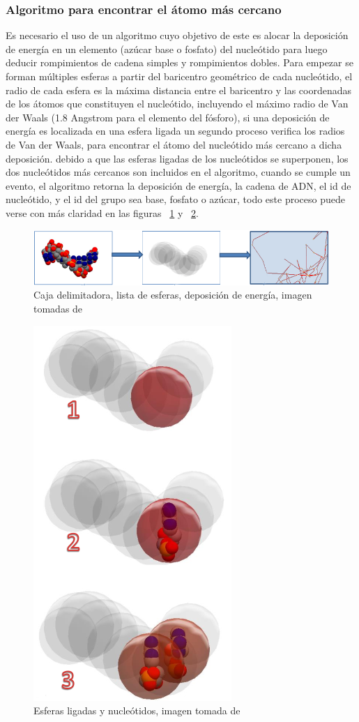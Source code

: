 \subsubsection{Algoritmo para encontrar el átomo más cercano}
Es necesario el uso de un algoritmo cuyo objetivo de este es alocar la deposición de energía en un elemento (azúcar base o fosfato) del nucleótido para luego deducir rompimientos de cadena simples y rompimientos dobles.
Para empezar se forman múltiples esferas a partir del baricentro geométrico de cada nucleótido, el radio de cada esfera es la máxima distancia entre el baricentro y las coordenadas de los átomos que constituyen el nucleótido, incluyendo el máximo radio de Van der Waals (1.8 Angstrom para el elemento del fósforo), si una deposición de energía es localizada en una esfera ligada un segundo proceso verifica los radios de Van der Waals, para encontrar el átomo del nucleótido más cercano a dicha deposición. debido a que las esferas ligadas de los nucleótidos se superponen, los dos nucleótidos más cercanos son incluidos en el algoritmo, cuando se cumple un evento, el algoritmo retorna la deposición de energía, la cadena de ADN, el id de nucleótido, y el id del grupo sea base, fosfato o azúcar, todo este proceso puede verse con más claridad en las figuras ~\ref{fig:deepbox} y ~\ref{fig:algoritmo}.


\begin{figure}[htbp]
    \centering
    \includegraphics[width=.8\linewidth]{./Figures/aalgo.png}
    \caption[Caja delimitadora]{Caja delimitadora, lista de esferas, deposición de energía, imagen tomadas de \cite{handson} }
    \label{fig:deepbox}
\end{figure}

\begin{figure}[htbp]
    \centering
    \includegraphics[width=.3\linewidth]{./Figures/algo.png}
    \caption[Esferas ligadas y nucleótidos]{Esferas ligadas y nucleótidos, imagen tomada de \cite{handson}}
    \label{fig:algoritmo}
\end{figure}

